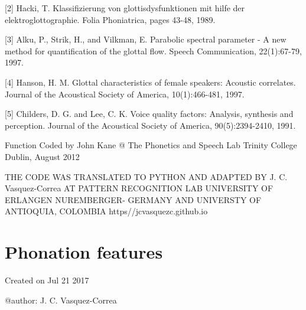 \documentclass[letterpaper,10pt,english]{sphinxmanual}
\let\sphinxpxdimen\pdfpxdimen\else\newdimen\sphinxpxdimen
\begin{document}
\begin{fulllineitems}
\begin{description}
{[}2{]} Hacki, T. Klassifizierung von glottisdysfunktionen mit hilfe der elektroglottographie. Folia Phoniatrica, pages 43-48, 1989.

{[}3{]} Alku, P., Strik, H., and Vilkman, E. Parabolic spectral parameter - A new method for quantification of the glottal flow. Speech Communication, 22(1):67-79, 1997.

{[}4{]} Hanson, H. M. Glottal characteristics of female speakers: Acoustic correlates. Journal of the Acoustical Society of America, 10(1):466-481, 1997.

{[}5{]} Childers, D. G. and Lee, C. K. Voice quality factors: Analysis, synthesis and perception. Journal of the Acoustical Society of  America, 90(5):2394-2410, 1991.

\end{description}

Function Coded by John Kane @ The Phonetics and Speech Lab
Trinity College Dublin, August 2012

THE CODE WAS TRANSLATED TO PYTHON AND ADAPTED BY J. C. Vasquez-Correa
AT PATTERN RECOGNITION LAB UNIVERSITY OF ERLANGEN NUREMBERGER- GERMANY
AND UNIVERSTY OF ANTIOQUIA, COLOMBIA
https//jcvasquezc.github.io

\end{fulllineitems}



\chapter{Phonation features}
\label{\detokenize{Phonation:phonation-features}}\label{\detokenize{Phonation::doc}}
\noindent\sphinxincludegraphics[width=800\sphinxpxdimen]{{phonation_vowel}.png}
\label{\detokenize{Phonation:module-phonation}}
Created on Jul 21 2017

@author: J. C. Vasquez-Correa
\end{document}
